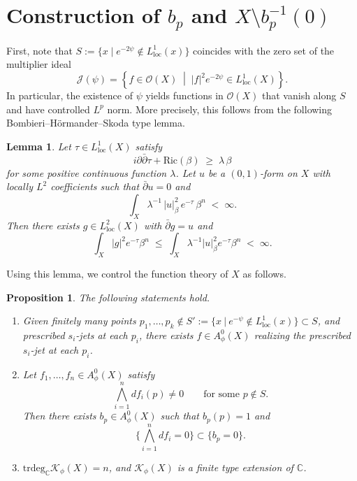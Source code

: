 \documentclass[a4paper, 12pt]{article}
\newcommand{\cK}{\mathcal{K}}
\newcommand{\Ric}{\mathrm{Ric}}
\newcommand{\loc}{\mathrm{loc}}
\newcommand{\trdeg}{\mathrm{trdeg}}
\newtheorem{prop}[thm]{Proposition}
\newtheorem{lem}[thm]{Lemma}
\begin{document}
\section{Construction of $b_p$ and $X\setminus b_p^{-1}(0)$}\label{cutout}
First, note that $S:=\{x \mid e^{-2\psi}\notin L^1_\loc(x)\}$ coincides with the zero set of the multiplier ideal
\[
\mathcal{J}(\psi)
=
\left\{
f \in \mathcal{O}(X)
\;\middle|\;
|f|^2 e^{-2\psi} \in L^1_\loc(X)
\right\}.
\]
In particular, the existence of $\psi$ yields functions in $\mathcal{O}(X)$ that vanish along $S$ and have controlled $L^p$ norm. More precisely, this follows from the following Bombieri--H\"ormander--Skoda type lemma.
\begin{lem}\label{skoda}
Let $\tau\in L^1_\loc(X)$ satisfy
\[
i\partial\bar\partial\tau+\Ric(\beta)\;\ge\;\lambda\,\beta
\]
for some positive continuous function $\lambda$.
Let $u$ be a $(0,1)$-form on $X$ with locally $L^2$ coefficients such that $\bar\partial u=0$ and
\[
\int_X \lambda^{-1}\,|u|_\beta^2\,e^{-\tau}\,\beta^n \;<\;\infty.
\]
Then there exists $g\in L^2_{\loc}(X)$ with $\bar\partial g=u$ and
\[
\int_X |g|^2 e^{-\tau}\beta^n \;\le\; \int_X \lambda^{-1}|u|_\beta^2 e^{-\tau}\beta^n \;<\;\infty.
\]
\end{lem}
Using this lemma, we control the function theory of $X$ as follows.
\begin{prop}\label{jet}
The following statements hold.
\begin{enumerate}
\item[(a)] Given finitely many points $p_1,\dots,p_k\notin S':=\{x~|~e^{-\psi}\notin L^1_\loc(x)\}\subset S$, and prescribed $s_i$-jets at each
$p_i$, there exists $f\in A_\phi^0(X)$ realizing the prescribed $s_i$-jet at each $p_i$.

\item[(b)] Let $f_1,\dots,f_n\in A_\phi^0(X)$ satisfy
\[
\bigwedge_{i=1}^n df_i(p)\neq 0
\qquad\text{for some }p\notin S.
\]
Then there exists $b_p\in A_\phi^0(X)$ such that $b_p(p)=1$ and
\[
\{\textstyle\bigwedge_{i=1}^n df_i=0\}\subset \{b_p=0\}.
\]

\item[(c)] $\trdeg_\mathbb{C}\cK_\phi(X)=n$, and $\cK_\phi(X)$ is a finite type extension of $\mathbb{C}$.
\end{enumerate}
\end{prop}
\end{document}

